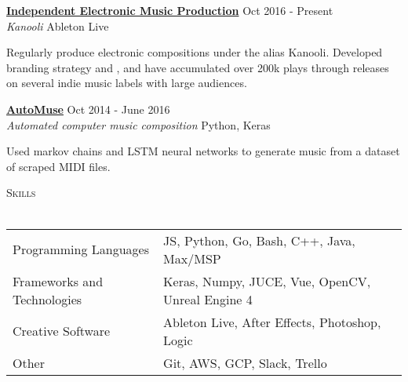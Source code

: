 \documentclass[11pt]{extarticle}
\newcommand{\lineunder} {
	\vspace*{-8pt} \\
	\hspace*{-18pt} \hrulefill \\
}
\newcommand{\header} [1] {
	{\hspace*{-18pt}\vspace*{6pt} \textsc{#1}}
	\vspace*{-6pt} \lineunder
}
\begin{document}
\noindent
\href{https://kanooli.com/}{\textbf{Independent Electronic Music Production}} \hfill Oct 2016 - Present\\
\textit{Kanooli} \hfill Ableton Live\\
\vspace{-25pt}
\begin{paragraph}{}
	Regularly produce electronic compositions under the alias Kanooli. Developed branding strategy and \href{https://kanoo.li/}{\color{blue}{accompanying website}}, and have accumulated over 200k plays through releases on several indie music labels with large audiences.\\
\end{paragraph}


\noindent
\href{https://github.com/nacgarg/AutoMuse}{\textbf{AutoMuse}} \hfill Oct 2014 - June 2016\\
\textit{Automated computer music composition} \hfill Python, Keras \\
\vspace{-25pt}
\begin{paragraph}{}
Used markov chains and LSTM neural networks to generate music from a dataset of scraped MIDI files. \\ 

\end{paragraph}

\noindent
\header{Skills}
\noindent

\begin{tabular}{ l l }
	Programming Languages & JS, Python, Go, Bash, C++, Java, Max/MSP \\
	Frameworks and Technologies & Keras, Numpy, JUCE, Vue, OpenCV, Unreal Engine 4 \\
	Creative Software             & Ableton Live, After Effects, Photoshop, Logic    \\
	Other                  & Git, AWS, GCP, Slack, Trello       \\
\end{tabular}
\vspace{2mm}
\noindent
\begin{center}
\end{center}
\end{document}
